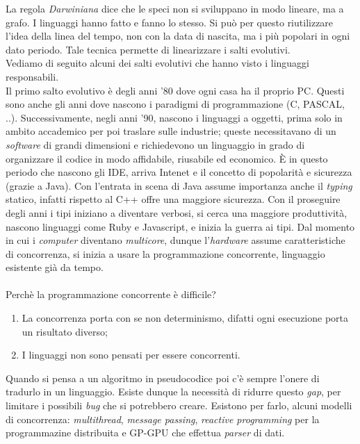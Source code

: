 \documentclass[10pt,a4paper]{book}
\begin{document}
La regola \textit{Darwiniana} dice che le speci non si sviluppano in modo lineare, ma a grafo. I linguaggi hanno fatto e fanno lo stesso. Si pu\`o per questo riutilizzare l'idea della linea del tempo, non con la data di nascita, ma i pi\`u popolari in ogni dato periodo. Tale tecnica permette di linearizzare i salti evolutivi.\\
Vediamo di seguito alcuni dei salti evolutivi che hanno visto i linguaggi responsabili.\\
Il primo salto evolutivo \`e degli anni '80 dove ogni casa ha il proprio PC. Questi sono anche gli anni dove nascono i paradigmi di programmazione (C, PASCAL, ..). Successivamente, negli anni '90, nascono i linguaggi a oggetti, prima solo in ambito accademico per poi traslare sulle industrie; queste necessitavano di un \textit{software} di grandi dimensioni e richiedevono un linguaggio in grado di organizzare il codice in modo affidabile, riusabile ed economico. \`E in questo periodo che nascono gli IDE, arriva Intenet  e il concetto di popolarit\`a e sicurezza (grazie a Java). Con l'entrata in scena di Java assume importanza anche il \textit{typing} statico, infatti rispetto al C++ offre una maggiore sicurezza. Con il proseguire degli anni i tipi iniziano a diventare verbosi, si cerca una maggiore produttivit\`a, nascono linguaggi come Ruby e Javascript, e inizia la guerra ai tipi. Dal momento in cui i \textit{computer} diventano \textit{multicore}, dunque l'\textit{hardware} assume caratteristiche di concorrenza, si inizia a usare la programmazione concorrente, linguaggio esistente gi\`a da tempo.\\\\
Perch\`e la programmazione concorrente \`e difficile?
\begin{enumerate}
\item La concorrenza porta con se non determinismo, difatti ogni esecuzione porta un risultato diverso;
\item I linguaggi non sono pensati per essere concorrenti.
\end{enumerate}
\noindent
Quando si pensa a un algoritmo in pseudocodice poi c'\`e sempre l'onere di tradurlo in un linguaggio. Esiste dunque la necessit\`a di ridurre questo \textit{gap}, per limitare i possibili \textit{bug} che si potrebbero creare. Esistono per farlo, alcuni modelli di concorrenza: \textit{multithread}, \textit{message passing}, \textit{reactive programming} per la programmazine distribuita e GP-GPU che effettua \textit{parser} di dati.\\\\
\end{document}
